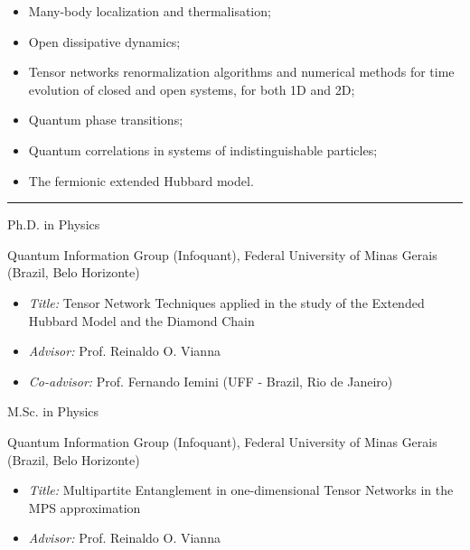 \documentclass[a4paper,10pt]{article}
\newlength{\cvcolumngapwidth}
\newlength{\cvleftcolumnwidth}
\newlength{\cvrightcolumnwidth}
\newcommand{\cvsectionstyle}[1]{{\normalsize\cvsectionfont\textcolor{cvsectioncolor}{#1}}}
\newcommand{\cvtitlestyle}[1]{{\normalsize\cvtitlefont\textcolor{cvtitlecolor}{#1}}}
\newcommand{\cvdurationstyle}[1]{{\normalsize\cvdurationfont\textcolor{cvdurationcolor}{#1}}}
\newlength{\cvafteritemskipamount}
\newlength{\cvaftersectionskipamount}
\newlength{\cvaftertitleskipamount}
\newlength{\cvparskip}
\newcommand{\cvsection}[1]{
    \begin{minipage}[t]{\cvleftcolumnwidth}
        \raggedleft\cvsectionstyle{#1}
    \end{minipage}%
    \hspace{\cvcolumngapwidth}%
    \begin{minipage}[t]{\cvrightcolumnwidth}
        \textcolor{cvrulecolor}{\rule{\cvrightcolumnwidth}{0.5mm}}
    \end{minipage}
    \vspace{\cvaftersectionskipamount}}
\newcommand{\cvitem}[2]{
    \begin{minipage}[t]{\cvleftcolumnwidth}
        \raggedleft #1
    \end{minipage}%
    \hspace{\cvcolumngapwidth}%
    \begin{minipage}[t]{\cvrightcolumnwidth}
        \setlength{\parskip}{\cvparskip} #2
    \end{minipage}
    \vspace{\cvafteritemskipamount}}
\newcommand{\cvtitle}[1]{
    \cvtitlestyle{#1}
    \vspace{\cvaftertitleskipamount}
    \vspace{-\cvparskip}}
\begin{document}
\cvitem{\cvdurationstyle{}}
    {\cvtitle{}
    \begin{itemize}[leftmargin=*]
    \item Many-body localization and thermalisation;
    \item Open dissipative dynamics;
    \item Tensor networks renormalization algorithms and numerical methods for time evolution of closed and open systems, for both 1D and 2D;
    \item Quantum phase transitions;
    \item Quantum correlations in systems of indistinguishable particles;
    \item The fermionic extended Hubbard model.
    \end{itemize}}

\cvsection{Education}

\cvitem{\cvdurationstyle{2016 - Present}}
    {\cvtitle{Ph.D. in Physics}

    Quantum Information Group (Infoquant), Federal University of Minas Gerais (Brazil, Belo Horizonte)
    
        \begin{itemize}[leftmargin=*]
        \item \textit{Title:} Tensor Network Techniques applied in the study 
        of the Extended Hubbard Model and the Diamond Chain
        
        \item \textit{Advisor:} Prof. Reinaldo O. Vianna
        
        \item \textit{Co-advisor:} Prof. Fernando Iemini (UFF - Brazil, Rio de Janeiro)
        \end{itemize}}

\cvitem{\cvdurationstyle{2014 - 2016}}
    {\cvtitle{M.Sc. in Physics}

    Quantum Information Group (Infoquant), Federal University of Minas Gerais (Brazil, Belo Horizonte)
    
    \begin{itemize}[leftmargin=*]
        \item \textit{Title:} Multipartite Entanglement in one-dimensional Tensor Networks in the MPS approximation
        
        \item \textit{Advisor:} Prof. Reinaldo O. Vianna
        
        \end{itemize}}
\end{document}
